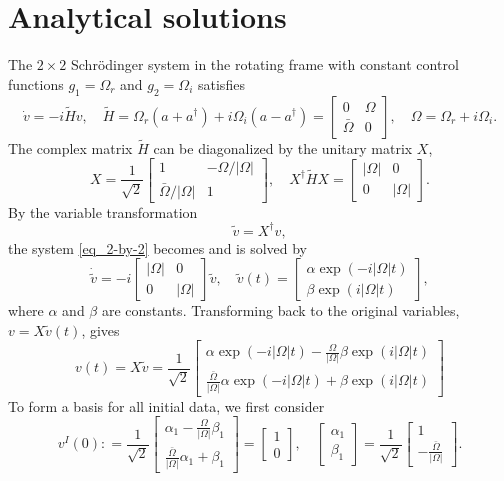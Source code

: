 \documentclass[11pt]{article}
\begin{document}
\section{Analytical solutions}

The $2\times 2$ Schr\"odinger system in the rotating frame with constant control functions $g_1=
\Omega_r$ and $g_2=\Omega_i$ satisfies
\begin{equation}\label{eq_2-by-2}
\dot{v} = -i \widetilde{H} v,\quad \widetilde{H} = \Omega_r(a + a^\dag) + i \Omega_i(a-a^\dag) =
%
\begin{bmatrix}
  0 & \Omega \\
  \bar{\Omega} & 0
\end{bmatrix},\quad \Omega = \Omega_r + i\Omega_i.
\end{equation}
The complex matrix $\widetilde{H}$ can be diagonalized by the unitary matrix $X$,
\[
X =
\frac{1}{\sqrt{2}}
\begin{bmatrix}
  1 & -\Omega/|\Omega| \\
  \bar{\Omega}/|\Omega| & 1
\end{bmatrix},\quad
X^\dag \widetilde{H} X = \begin{bmatrix}
  |\Omega| & 0 \\
  0 & |\Omega|
\end{bmatrix}.
\]
By the variable transformation
\[
\widetilde{v} = X^\dag v,
\]
the system \eqref{eq_2-by-2} becomes and is solved by
\[
\dot{\widetilde{v}} = -i
\begin{bmatrix}
  |\Omega| & 0 \\
  0 & |\Omega|
\end{bmatrix} \widetilde{v},\quad
%
\widetilde{v}(t) = \begin{bmatrix}
\alpha \exp(-i |\Omega| t) \\
\beta \exp(i |\Omega| t)
\end{bmatrix},
\]
where $\alpha$ and $\beta$ are constants. Transforming back to the original variables, $v = X
\widetilde{v}(t)$, gives
\[
v(t) = X \widetilde{v} = \frac{1}{\sqrt{2}}
\begin{bmatrix}
  \alpha \exp(-i |\Omega| t) - \frac{\Omega}{|\Omega|} \beta \exp(i |\Omega| t) \\
  \frac{\bar{\Omega}}{|\Omega|} \alpha \exp(-i |\Omega| t) + \beta \exp(i |\Omega| t)
\end{bmatrix}
\]
To form a basis for all initial data, we first consider
\[
v^{I}(0) : =
%
\frac{1}{\sqrt{2}}
\begin{bmatrix}
  \alpha_1 - \frac{\Omega}{|\Omega|} \beta_1 \\
  \frac{\bar{\Omega}}{|\Omega|} \alpha_1 + \beta_1
\end{bmatrix} = \begin{bmatrix} 1 \\ 0 \end{bmatrix},
%
\quad
\begin{bmatrix}
\alpha_1\\ \beta_1
\end{bmatrix}=
\frac{1}{\sqrt{2}}
\begin{bmatrix}
1 \\ -\frac{\bar{\Omega}}{|\Omega|}
\end{bmatrix}.
\]
\end{document}
